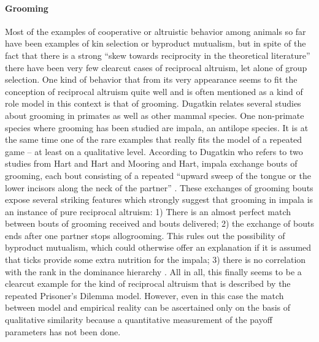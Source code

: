 \paragraph{Grooming}
\label{grooming}

Most of the examples of cooperative or altruistic behavior among animals so
far have been examples of kin selection or byproduct mutualism, but in spite
of the fact that there is a strong ``skew towards reciprocity in the
theoretical literature'' \cite[p.\ 167]{dugatkin:1997} there have been very few
clearcut cases of reciprocal altruism, let alone of group selection. One kind
of behavior that from its very appearance seems to fit the conception of
reciprocal altruism quite well and is often mentioned as a kind of role model
in this context is that of grooming. Dugatkin relates several studies about
grooming in primates as well as other mammal species. \label{impalaGrooming}
One non-primate species where grooming has been studied are impala, an
antilope species. It is at the same time one of the rare examples that really
fits the model of a repeated game -- at least on a qualitative level.
According to Dugatkin who refers to two studies from Hart and Hart and
Mooring and Hart, impala exchange bouts of grooming, each bout consisting of a
repeated ``upward sweep of the tongue or the lower incisors along the neck of
the partner'' \cite[p.\  91]{dugatkin:1997}. These exchanges of grooming bouts
expose several striking features which strongly suggest that grooming in
impala is an instance of pure reciprocal altruism: 1) There is an almost
perfect match between bouts of grooming received and bouts delivered; 2) the
exchange of bouts ends after one partner stops allogrooming. This rules out
the possibility of byproduct mutualism, which could otherwise offer an
explanation if it is assumed that ticks provide some extra nutrition for the
impala; 3) there is no correlation with the rank in the dominance hierarchy
\cite[p.\ 91-94]{dugatkin:1997}. All in all, this finally seems to be a
clearcut example for the kind of reciprocal altruism that is described by the
repeated Prisoner's Dilemma model. However, even in this case the match
between model and empirical reality can be ascertained only on the basis of
qualitative similarity because a quantitative measurement of the payoff
parameters has not been done.

